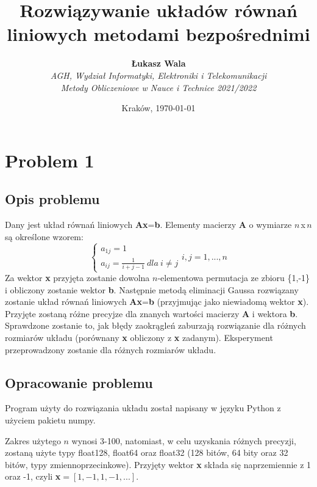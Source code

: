\documentclass{article}
\title{Rozwiązywanie układów równań liniowych metodami bezpośrednimi}
\author{\textbf{Łukasz Wala}\\
    \textit{AGH, Wydział Informatyki, Elektroniki i Telekomunikacji} \\
    \textit{Metody Obliczeniowe w Nauce i Technice 2021/2022}}
\date{Kraków, \today}
\begin{document}
\maketitle

\section{Problem 1}
\subsection{Opis problemu}
Dany jest układ równań liniowych \textbf{Ax}=\textbf{b}.
Elementy macierzy \textbf{A} o wymiarze $n$\,x\,$n$ są określone wzorem:
$$
\begin{cases}
    a_{1j}=1\\
    a_{ij}=\frac{1}{i+j-1} \ dla \ i \ne j
\end{cases}i,j=1,...,n
$$
Za wektor \textbf{x} przyjęta zostanie dowolna $n$-elementowa permutacja ze zbioru \{1,-1\} i obliczony zostanie
wektor \textbf{b}. Następnie metodą eliminacji Gaussa rozwiązany zostanie układ równań liniowych \textbf{Ax}=\textbf{b}
(przyjmując jako niewiadomą wektor \textbf{x}). Przyjęte zostaną różne precyjze dla znanych wartości macierzy \textbf{A} i
wektora \textbf{b}. Sprawdzone zostanie to, jak błędy zaokrągleń zaburzają rozwiązanie dla różnych rozmiarów układu
(porównany \textbf{x} obliczony z \textbf{x} zadanym). Eksperyment przeprowadzony zostanie dla różnych rozmiarów układu.

\subsection{Opracowanie problemu}
Program użyty do rozwiązania układu został napisany w języku Python z użyciem pakietu numpy.

Zakres użytego $n$ wynosi 3-100, natomiast, w celu uzyskania różnych precyzji, zostaną użyte typy float128, float64 oraz float32
(128 bitów, 64 bity oraz 32 bitów, typy zmiennoprzecinkowe). Przyjęty wektor \textbf{x} składa się naprzemiennie z 1 oraz -1, czyli
\textbf{x}$=[1,-1,1,-1,...]$.
\end{document}

